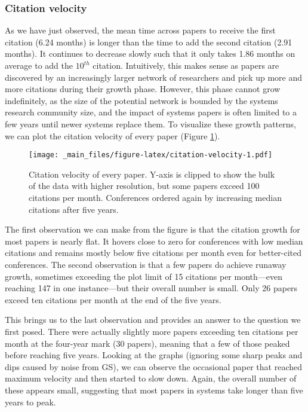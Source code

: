 \documentclass{article}
\begin{document}
\hypertarget{citation-velocity}{%
\subsubsection{Citation velocity}\label{citation-velocity}}

As we have just observed, the mean time across papers to receive the first citation
(6.24 months)
is longer than the time to add the second citation
(2.91 months).
It continues to decrease slowly such that it only takes
1.86 months on average to add the \(10^{th}\) citation.
Intuitively, this makes sense as papers are discovered by an increasingly larger network of researchers and pick up more and more citations during their growth phase.
However, this phase cannot grow indefinitely, as the size of the potential network is bounded by the systems research community size, and the impact of systems papers is often limited to a few years until newer systems replace them.
To visualize these growth patterns, we can plot the citation velocity of every paper (Figure \ref{fig:citation-velocity}).

\begin{figure}
\centering
\texttt{[image: \_main\_files/figure-latex/citation-velocity-1.pdf]}
\caption{\label{fig:citation-velocity}Citation velocity of every paper. Y-axis is clipped to show the bulk of the data with higher resolution, but some papers exceed 100 citations per month. Conferences ordered again by increasing median citations after five years.}
\end{figure}

The first observation we can make from the figure is that the citation growth for most papers is nearly flat.
It hovers close to zero for conferences with low median citations and remains mostly below five citations per month even for better-cited conferences.
The second observation is that a few papers do achieve runaway growth, sometimes exceeding the plot limit of 15 citations per month---even reaching 147 in one instance---but their overall number is small.
Only 26 papers exceed ten citations per month at the end of the five years.

This brings us to the last observation and provides an answer to the question we first posed.
There were actually slightly more papers exceeding ten citations per month at the four-year mark (30 papers), meaning that a few of those peaked before reaching five years.
Looking at the graphs (ignoring some sharp peaks and dips caused by noise from GS), we can observe the occasional paper that reached maximum velocity and then started to slow down.
Again, the overall number of these appears small, suggesting that most papers in systems take longer than five years to peak.
\end{document}
